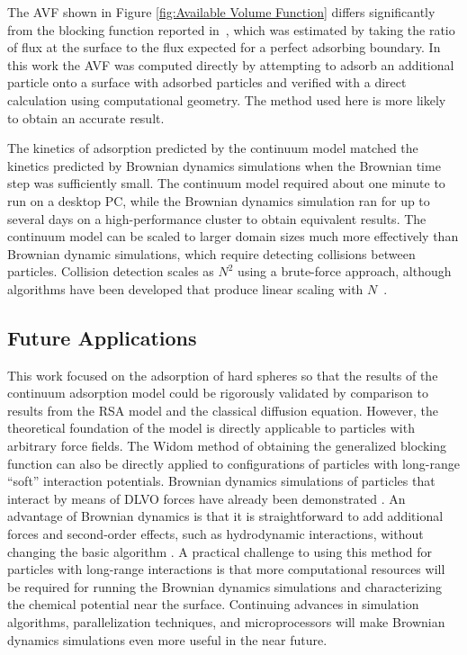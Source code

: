 The AVF shown in Figure \ref{fig:Available Volume Function} differs
significantly from the blocking function reported in~\cite{Magan2004},
which was estimated by taking the ratio of flux at the surface to
the flux expected for a perfect adsorbing boundary. In this work the
AVF was computed directly by attempting to adsorb an additional particle
onto a surface with adsorbed particles and verified with a direct
calculation using computational geometry. The method used here is
more likely to obtain an accurate result.

The kinetics of adsorption predicted by the continuum model matched
the kinetics predicted by Brownian dynamics simulations when the Brownian
time step was sufficiently small. The continuum model required about
one minute to run on a desktop PC, while the Brownian dynamics simulation
ran for up to several days on a high-performance cluster to obtain
equivalent results. The continuum model can be scaled to larger domain
sizes much more effectively than Brownian dynamic simulations, which
require detecting collisions between particles. Collision detection
scales as $N^{2}$ using a brute-force approach, although algorithms
have been developed that produce linear scaling with $N$~\cite{Taylor2010}.


\subsection{Future Applications}

This work focused on the adsorption of hard spheres so that the results
of the continuum adsorption model could be rigorously validated by
comparison to results from the RSA model and the classical diffusion
equation. However, the theoretical foundation of the model is directly
applicable to particles with arbitrary force fields. The Widom method
of obtaining the generalized blocking function can also be directly
applied to configurations of particles with long-range {}``soft''
interaction potentials. Brownian dynamics simulations of particles
that interact by means of DLVO forces have already been demonstrated
\cite{Magan2006,Quinn2008,Unni2005}. An advantage of Brownian dynamics
is that it is straightforward to add additional forces and second-order
effects, such as hydrodynamic interactions, without changing the basic
algorithm \cite{Unni2005}. A practical challenge to using this method
for particles with long-range interactions is that more computational
resources will be required for running the Brownian dynamics simulations
and characterizing the chemical potential near the surface. Continuing
advances in simulation algorithms, parallelization techniques, and
microprocessors will make Brownian dynamics simulations even more
useful in the near future. 


